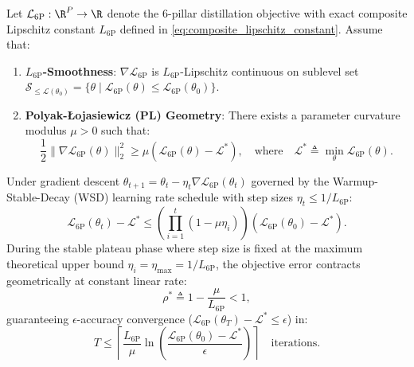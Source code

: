 \begin{theorem}
\label{thm:kd_pl_convergence}
Let $\mathcal{L}_{\text{6P}}: \R^P \to \R$ denote the 6-pillar distillation objective with exact composite Lipschitz constant $L_{\text{6P}}$ defined in \eqref{eq:composite_lipschitz_constant}. Assume that:
\begin{enumerate}
    \item \textbf{$L_{\text{6P}}$-Smoothness}: $\nabla \mathcal{L}_{\text{6P}}$ is $L_{\text{6P}}$-Lipschitz continuous on sublevel set $\mathcal{S}_{\le \mathcal{L}(\theta_0)} = \{\theta \mid \mathcal{L}_{\text{6P}}(\theta) \le \mathcal{L}_{\text{6P}}(\theta_0)\}$.
    \item \textbf{Polyak-\L{}ojasiewicz (PL) Geometry}: There exists a parameter curvature modulus $\mu > 0$ such that:
    \begin{equation}
    \frac{1}{2} \| \nabla \mathcal{L}_{\text{6P}}(\theta) \|_2^2 \ge \mu \left( \mathcal{L}_{\text{6P}}(\theta) - \mathcal{L}^* \right), \quad \text{where} \quad \mathcal{L}^* \triangleq \min_{\theta} \mathcal{L}_{\text{6P}}(\theta).
    \label{eq:pl_inequality}
    \end{equation}
\end{enumerate}
Under gradient descent $\theta_{t+1} = \theta_t - \eta_t \nabla \mathcal{L}_{\text{6P}}(\theta_t)$ governed by the Warmup-Stable-Decay (WSD) learning rate schedule with step sizes $\eta_t \le 1/L_{\text{6P}}$:
\begin{equation}
\mathcal{L}_{\text{6P}}(\theta_t) - \mathcal{L}^* \le \left( \prod_{i=1}^t (1 - \mu \eta_i) \right) \left( \mathcal{L}_{\text{6P}}(\theta_0) - \mathcal{L}^* \right).
\label{eq:thm10_wsd_contraction}
\end{equation}
During the stable plateau phase where step size is fixed at the maximum theoretical upper bound $\eta_i = \eta_{\max} = 1/L_{\text{6P}}$, the objective error contracts geometrically at constant linear rate:
\begin{equation}
\rho^* \triangleq 1 - \frac{\mu}{L_{\text{6P}}} < 1,
\label{eq:exact_geometric_contraction_rate}
\end{equation}
guaranteeing $\epsilon$-accuracy convergence ($\mathcal{L}_{\text{6P}}(\theta_T) - \mathcal{L}^* \le \epsilon$) in:
\begin{equation}
T \le \left\lceil \frac{L_{\text{6P}}}{\mu} \ln \left( \frac{\mathcal{L}_{\text{6P}}(\theta_0) - \mathcal{L}^*}{\epsilon} \right) \right\rceil \quad \text{iterations}.
\label{eq:iteration_complexity_bound}
\end{equation}
\end{theorem}

